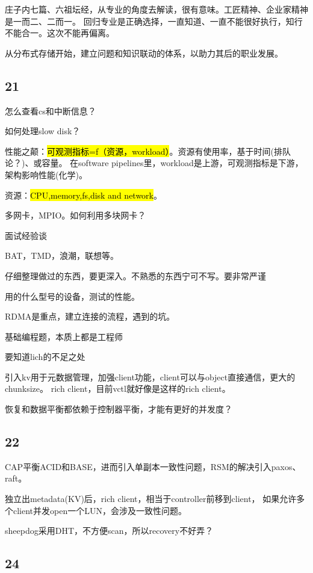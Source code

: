 庄子内七篇、六祖坛经，从专业的角度去解读，很有意味。工匠精神、企业家精神是一而二、二而一。
回归专业是正确选择，一直知道、一直不能很好执行，知行不能合一。这次不能再偏离。

从分布式存储开始，建立问题和知识联动的体系，以助力其后的职业发展。

\subsection{21}

怎么查看cs和中断信息？

如何处理slow disk？

性能之颠：\hl{可观测指标=f（资源，workload）}。资源有使用率，基于时间(排队论？)、或容量。
在software pipelines里，workload是上游，可观测指标是下游，架构影响性能(化学)。

资源：\hl{CPU,memory,fs,disk and network}。

多网卡，MPIO。如何利用多块网卡？

面试经验谈
\begin{enumbox}
\item BAT，TMD，浪潮，联想等。
\item 仔细整理做过的东西，要更深入。不熟悉的东西宁可不写。要非常严谨
\item 用的什么型号的设备，测试的性能。
\item RDMA是重点，建立连接的流程，遇到的坑。
\item 基础编程题，本质上都是工程师
\item 要知道lich的不足之处
\end{enumbox}

引入kv用于元数据管理，加强client功能，client可以与object直接通信，更大的chunksize。
rich client，目前vctl就好像是这样的rich client。

恢复和数据平衡都依赖于控制器平衡，才能有更好的并发度？

\subsection{22}

CAP平衡ACID和BASE，进而引入单副本一致性问题，RSM的解决引入paxos、raft。

独立出metadata(KV)后，rich client，相当于controller前移到client，
如果允许多个client并发open一个LUN，会涉及一致性问题。

sheepdog采用DHT，不方便scan，所以recovery不好弄？

\subsection{24}


